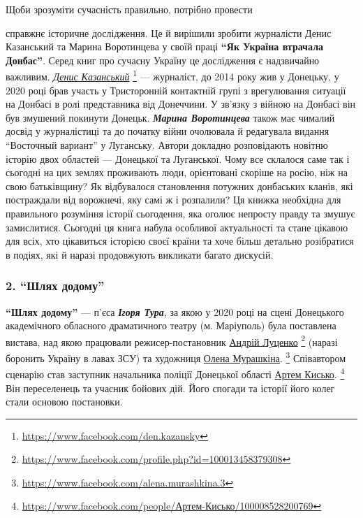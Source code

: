 Щоби зрозуміти сучасність правильно, потрібно провести\par\noindent справжнє історичне
дослідження. Це й вирішили зробити журналісти Денис Казанський та Марина
Воротинцева у своїй праці \textbf{\enquote{Як Україна втрачала Донбас}}. Серед книг про сучасну
Україну це дослідження є надзвичайно важливим. \href{https://www.facebook.com/den.kazansky}{\emph{Денис Казанський}}%
\footnote{\url{https://www.facebook.com/den.kazansky}}
 — журналіст, до 2014 року жив у Донецьку, у 2020 році брав участь у Тристоронній контактній
групі з врегулювання ситуації на Донбасі в ролі представника від Донеччини. У
зв'язку з війною на Донбасі він був змушений покинути Донецьк. \emph{\textbf{Марина
Воротинцева}} також має чималий досвід у журналістиці та до початку війни
очолювала й редагувала видання \enquote{Восточный вариант} у Луганську. Автори докладно
розповідають новітню історію двох областей — Донецької та Луганської. Чому все
склалося саме так і сьогодні на цих землях проживають люди, орієнтовані скоріше
на росію, ніж на свою батьківщину? Як відбувалося становлення потужних
донбаських кланів, які постраждали від ворожнечі, яку самі ж і розпалили? Ця
книжка необхідна для правильного розуміння історії сьогодення, яка оголює
непросту правду та змушує замислитися. Сьогодні ця книга набула особливої
актуальності та стане цікавою для всіх, хто цікавиться історією своєї країни та
хоче більш детально розібратися в подіях, які й наразі продовжують викликати
багато дискусій.

\subsubsection{2. \enquote{Шлях додому}}


\textbf{\enquote{Шлях додому}} — п'єса \emph{\textbf{Ігоря Тура}}, за якою у 2020 році на сцені Донецького
академічного обласного драматичного театру (м. Маріуполь) була поставлена
вистава, над якою працювали режисер-постановник \href{https://www.facebook.com/profile.php?id=100013458379308}{Андрій Луценко}%
\footnote{\url{https://www.facebook.com/profile.php?id=100013458379308}}
(наразі боронить
Україну в лавах ЗСУ) та художниця \href{https://www.facebook.com/alena.murashkina.3}{Олена Мурашкіна}.%
\footnote{\url{https://www.facebook.com/alena.murashkina.3}} Співавтором сценарію став
заступник начальника поліції Донецької області \href{https://www.facebook.com/people/Артем-Кисько/100008528200769}{Артем Кисько}.%
\footnote{\url{https://www.facebook.com/people/Артем-Кисько/100008528200769}}
Він переселенець та учасник бойових дій. Його спогади та історії його колег стали основою постановки.

